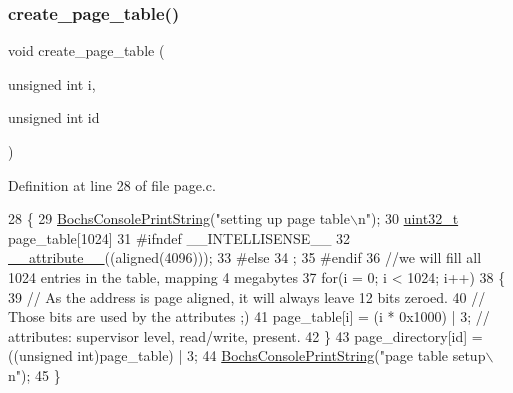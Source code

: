 \mbox{\label{a00044_a7bb2c9b4c69002e17903710ce4de395c_a7bb2c9b4c69002e17903710ce4de395c}} 
\subsubsection{\texorpdfstring{create\+\_\+page\+\_\+table()}{create\_page\_table()}}
{\footnotesize\ttfamily void create\+\_\+page\+\_\+table (\begin{DoxyParamCaption}\item[{unsigned int}]{i,  }\item[{unsigned int}]{id }\end{DoxyParamCaption})}



Definition at line 28 of file page.\+c.


\begin{DoxyCode}
28                                                         \{
29     \hyperlink{a00017_a19e1f554d03c977f8b947f21489daa41_a19e1f554d03c977f8b947f21489daa41}{BochsConsolePrintString}(\textcolor{stringliteral}{"setting up page table\(\backslash\)n"});
30     \hyperlink{a00068_a435d1572bf3f880d55459d9805097f62_a435d1572bf3f880d55459d9805097f62}{uint32\_t} page\_table[1024]
31 \textcolor{preprocessor}{    #ifndef \_\_INTELLISENSE\_\_ }
32         \hyperlink{a00044_a37f8e955bf961194d85eb31c4083e0ba_a37f8e955bf961194d85eb31c4083e0ba}{\_\_attribute\_\_}((aligned(4096)));
33 \textcolor{preprocessor}{    #else}
34         ;
35 \textcolor{preprocessor}{    #endif}
36     \textcolor{comment}{//we will fill all 1024 entries in the table, mapping 4 megabytes}
37     \textcolor{keywordflow}{for}(i = 0; i < 1024; i++)
38     \{
39         \textcolor{comment}{// As the address is page aligned, it will always leave 12 bits zeroed.}
40         \textcolor{comment}{// Those bits are used by the attributes ;)}
41         page\_table[i] = (i * 0x1000) | 3; \textcolor{comment}{// attributes: supervisor level, read/write, present.}
42     \}
43     page\_directory[id] = ((\textcolor{keywordtype}{unsigned} int)page\_table) | 3;
44     \hyperlink{a00017_a19e1f554d03c977f8b947f21489daa41_a19e1f554d03c977f8b947f21489daa41}{BochsConsolePrintString}(\textcolor{stringliteral}{"page table setup\(\backslash\)n"});
45 \}
\end{DoxyCode}
\mbox{\label{a00044_a51f6a37816540dea572d38f2713e9f5a_a51f6a37816540dea572d38f2713e9f5a}} 
